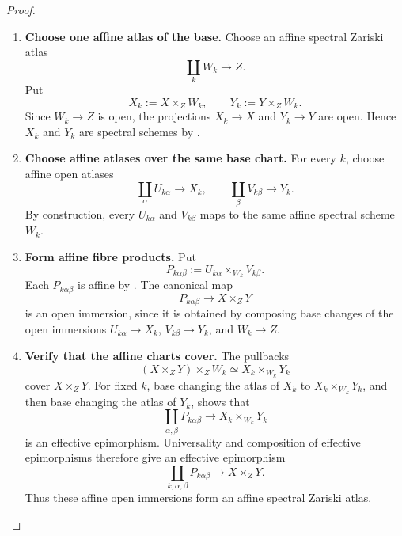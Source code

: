 \begin{proof}
\leavevmode
\begin{enumerate}[label=\textup{(\arabic*)}]
    \item \textbf{Choose one affine atlas of the base.}
    Choose an affine spectral Zariski atlas
    \[
        \coprod_kW_k\longrightarrow Z.
    \]
    Put
    \[
        X_k:=X\times_ZW_k,
        \qquad
        Y_k:=Y\times_ZW_k.
    \]
    Since \(W_k\to Z\) is open, the projections \(X_k\to X\) and
    \(Y_k\to Y\) are open. Hence \(X_k\) and \(Y_k\) are spectral schemes
    by .

    \item \textbf{Choose affine atlases over the same base chart.}
    For every \(k\), choose affine open atlases
    \[
        \coprod_\alpha U_{k\alpha}\longrightarrow X_k,
        \qquad
        \coprod_\beta V_{k\beta}\longrightarrow Y_k.
    \]
    By construction, every \(U_{k\alpha}\) and \(V_{k\beta}\) maps to the
    same affine spectral scheme \(W_k\).

    \item \textbf{Form affine fibre products.}
    Put
    \[
        P_{k\alpha\beta}
        :=
        U_{k\alpha}\times_{W_k}V_{k\beta}.
    \]
    Each \(P_{k\alpha\beta}\) is affine by
    . The canonical map
    \[
        P_{k\alpha\beta}
        \longrightarrow
        X\times_ZY
    \]
    is an open immersion, since it is obtained by composing base changes of
    the open immersions \(U_{k\alpha}\to X_k\),
    \(V_{k\beta}\to Y_k\), and \(W_k\to Z\).

    \item \textbf{Verify that the affine charts cover.}
    The pullbacks
    \[
        (X\times_ZY)\times_ZW_k
        \simeq
        X_k\times_{W_k}Y_k
    \]
    cover \(X\times_ZY\). For fixed \(k\), base changing the atlas of
    \(X_k\) to \(X_k\times_{W_k}Y_k\), and then base changing the atlas of
    \(Y_k\), shows that
    \[
        \coprod_{\alpha,\beta}P_{k\alpha\beta}
        \longrightarrow
        X_k\times_{W_k}Y_k
    \]
    is an effective epimorphism. Universality and composition of effective
    epimorphisms therefore give an effective epimorphism
    \[
        \coprod_{k,\alpha,\beta}P_{k\alpha\beta}
        \longrightarrow
        X\times_ZY.
    \]
    Thus these affine open immersions form an affine spectral Zariski atlas.
\end{enumerate}
\end{proof}

